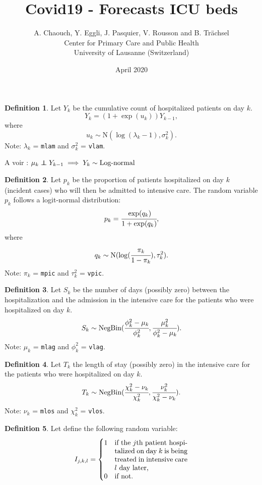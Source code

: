 \documentclass[10pt,twocolumn,a4paper]{article}
\author{
  A. Chaouch, Y. Eggli, J. Pasquier, V. Rousson and B. Trächsel\\
  Center for Primary Care and Public Health\\
  University of Lausanne (Switzerland)
}
\title{
  Covid19 - Forecasts ICU beds
}
\date{April 2020}
\newcommand\independent{\protect\mathpalette{\protect\independenT}{\perp}}
\def\independenT#1#2{\mathrel{\rlap{$#1#2$}\mkern2mu{#1#2}}}
\newcommand{\NB}{\text{NegBin}}
\theoremstyle{definition}
\newtheorem{definition}{Definition}
\theoremstyle{remark}
\theoremstyle{plain}
\begin{document}
\maketitle

\begin{definition}

  Let $Y_k$ be the cumulative count of hospitalized patients on day $k$.
  \[ Y_k = (1 + \exp(u_k)) Y_{k-1}, \]
  where
  \[ u_k \sim \text{N}(\log(\lambda_k-1), \sigma_k^2). \]
  Note: $\lambda_k$ = \verb|mlam| and $\sigma_k^2$ = \verb|vlam|.

\end{definition}

A voir : $\mu_k \independent Y_{k-1} \implies Y_k \sim \text{Log-normal}$

\begin{definition}

  Let $p_k$ be the proportion of patients hospitalized on day $k$ (incident
  cases) who will then be admitted to intensive care. The random variable $p_k$
  follows a logit-normal distribution:
  \[ p_k = \cfrac{\exp(q_k)}{1 + \exp(q_k)}, \]
  where
  \[ q_k \sim \text{N}(\log(\cfrac{\pi_k}{1-\pi_k}), \tau_k^2). \]
  Note: $\pi_k$ = \verb|mpic| and $\tau_k^2$ = \verb|vpic|.

\end{definition}

\begin{definition}

  Let $S_k$ be the number of days (possibly zero) between the hospitalization
  and the admission in the intensive care for the patients who were
  hospitalized on day $k$.
  \[ S_k \sim \NB(\cfrac{\phi_k^2-\mu_k}{\phi_k^2},
                  \cfrac{\mu_k^2}{\phi_k^2-\mu_k}). \]
  Note: $\mu_k$ = \verb|mlag| and $\phi_k^2$ = \verb|vlag|.

\end{definition}

\begin{definition}

  Let $T_k$ the length of stay (possibly zero) in the intensive care for the
  patients who were hospitalized on day $k$.
  \[ T_k \sim \NB(\cfrac{\chi_k^2-\nu_k}{\chi_k^2},
                  \cfrac{\nu_k^2}{\chi_k^2-\nu_k}). \]
  Note: $\nu_k$ = \verb|mlos| and $\chi_k^2$ = \verb|vlos|.

\end{definition}

\begin{definition}

  Let define the following random variable:
  \[
    I_{j,k,l} =
    \begin{cases}
      1 & \parbox[t]{.3\textwidth}{if the $j$th patient hospitalized on day $k$
          is being treated in intensive care $l$ day later,} \\
      0 & \text {if not.}
    \end{cases}
  \]

\end{definition}
\end{document}
